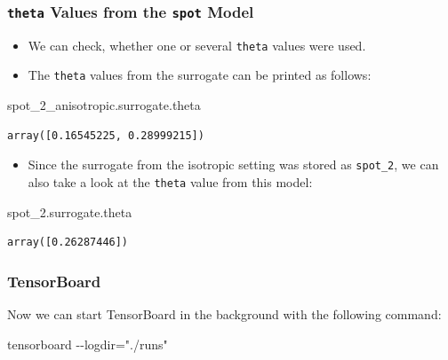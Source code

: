\documentclass[
  letterpaper,
  DIV=11,
  numbers=noendperiod]{scrreprt}
\newenvironment{Shaded}{\begin{snugshade}}{\end{snugshade}}
\newcommand{\NormalTok}[1]{\textcolor[rgb]{0.00,0.23,0.31}{#1}}
\providecommand{\tightlist}{%
  \setlength{\itemsep}{0pt}\setlength{\parskip}{0pt}}\usepackage{longtable,booktabs,array}
\begin{document}
\hypertarget{theta-values-from-the-spot-model}{%
\subsubsection{\texorpdfstring{\texttt{theta} Values from the
\texttt{spot}
Model}{theta Values from the spot Model}}\label{theta-values-from-the-spot-model}}

\begin{itemize}
\tightlist
\item
  We can check, whether one or several \texttt{theta} values were used.
\item
  The \texttt{theta} values from the surrogate can be printed as
  follows:
\end{itemize}

\begin{Shaded}
\begin{Highlighting}[]
\NormalTok{spot\_2\_anisotropic.surrogate.theta}
\end{Highlighting}
\end{Shaded}

\begin{verbatim}
array([0.16545225, 0.28999215])
\end{verbatim}

\begin{itemize}
\tightlist
\item
  Since the surrogate from the isotropic setting was stored as
  \texttt{spot\_2}, we can also take a look at the \texttt{theta} value
  from this model:
\end{itemize}

\begin{Shaded}
\begin{Highlighting}[]
\NormalTok{spot\_2.surrogate.theta}
\end{Highlighting}
\end{Shaded}

\begin{verbatim}
array([0.26287446])
\end{verbatim}

\hypertarget{tensorboard-5}{%
\subsubsection{TensorBoard}\label{tensorboard-5}}

Now we can start TensorBoard in the background with the following
command:

\begin{Shaded}
\begin{Highlighting}[]
\NormalTok{tensorboard {-}{-}logdir="./runs"}
\end{Highlighting}
\end{Shaded}
\end{document}

